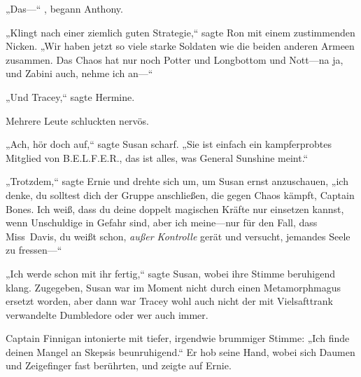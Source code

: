 „Das—“ , begann Anthony.

„Klingt nach einer ziemlich guten Strategie,“ sagte Ron mit einem zustimmenden Nicken. „Wir haben jetzt so viele starke Soldaten wie die beiden anderen Armeen zusammen. Das Chaos hat nur noch Potter und Longbottom und Nott—na ja, und Zabini auch, nehme ich an—“

„Und Tracey,“ sagte Hermine.

Mehrere Leute schluckten nervös.

„Ach, hör doch auf,“ sagte Susan scharf. „Sie ist einfach ein kampferprobtes Mitglied von B.E.L.F.E.R., das ist alles, was General Sunshine meint.“

„Trotzdem,“ sagte Ernie und drehte sich um, um Susan ernst anzuschauen, „ich denke, du solltest dich der Gruppe anschließen, die gegen Chaos kämpft, Captain Bones. Ich weiß, dass du deine doppelt magischen Kräfte nur einsetzen kannst, wenn Unschuldige in Gefahr sind, aber ich meine—nur für den Fall, dass Miss~Davis, du weißt schon, \emph{außer Kontrolle} gerät und versucht, jemandes Seele zu fressen—“

„Ich werde schon mit ihr fertig,“ sagte Susan, wobei ihre Stimme beruhigend klang. Zugegeben, Susan war im Moment nicht durch einen Metamorphmagus ersetzt worden, aber dann war Tracey wohl auch nicht der mit Vielsafttrank verwandelte Dumbledore oder wer auch immer.

Captain Finnigan intonierte mit tiefer, irgendwie brummiger Stimme: „Ich finde deinen Mangel an Skepsis beunruhigend.“ Er hob seine Hand, wobei sich Daumen und Zeigefinger fast berührten, und zeigte auf Ernie.

